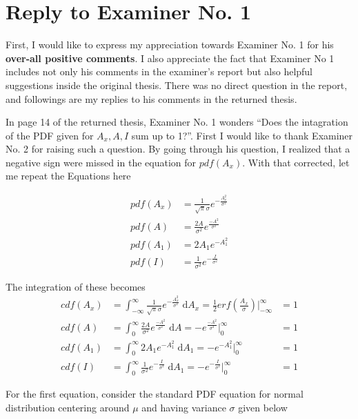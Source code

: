 \section*{Reply to Examiner No. 1}

\begin{replyheader}
\end{replyheader}  

First, I would like to express my appreciation towards Examiner No. 1 for his \textbf{over-all positive comments}.
I also appreciate the fact that Examiner No 1 includes
  not only his comments in the examiner's report
  but also helpful suggestions inside the original thesis.
There was no direct question in the report, and followings are my replies to his comments in the returned thesis.

In page 14 of the returned thesis, Examiner No. 1 wonders ``Does the intagration of the PDF given for $A_x, A, I$ sum up to 1?''.
First I would like to thank Examiner No. 2 for raising such a question.
By going through his question, I realized that a negative sign were missed in the equation for $pdf(A_x)$.
With that corrected, let me repeat the Equations here

\begin{align}
pdf(A_x) &= \frac{1}{\sqrt{\pi} \sigma} e^{- \frac{A_x^2}{\sigma^2}} \\
pdf(A)   &= \frac{2A}{\sigma^2} e^{\frac{-A^2}{\sigma^2}} \\
pdf(A_1) &= 2A_1 e^{-A_1^2} \\
pdf(I)   &= \frac{1}{\sigma^2} e^{-\frac{I}{\sigma^2}}
\end{align}

The integration of these becomes
\begin{align}
cdf(A_x) &= \int_{-\infty}^{\infty} \frac{1}{\sqrt{\pi} \sigma} e^{- \frac{A_x^2}{\sigma^2}}  \; \mathrm{d}A_x = \frac{1}{2} erf \left( \frac{A_x}{\sigma} \right)  \Big|_{-\infty}^{\infty} &= 1 \\
cdf(A) &= \int_0^{\infty} \frac{2A}{\sigma^2} e^{\frac{-A^2}{\sigma^2}}  \; \mathrm{d}A = -e^{\frac{-A^2}{\sigma^2}} \Big|_0^{\infty} &= 1\\
cdf(A_1) &= \int_0^{\infty} 2A_1 e^{-A_1^2} \; \mathrm{d}A_1 = -e^{-A_1^2} \Big|_0^{\infty} &= 1\\
cdf(I) &= \int_0^{\infty} \frac{1}{\sigma^2} e^{-\frac{I}{\sigma^2}} \; \mathrm{d}A_1 = -e^{-\frac{I}{\sigma^2}}  \Big|_0^{\infty} &= 1
\end{align}


For the first equation, consider the standard PDF equation for normal distribution centering around $\mu$ and having variance $\sigma$ given below

